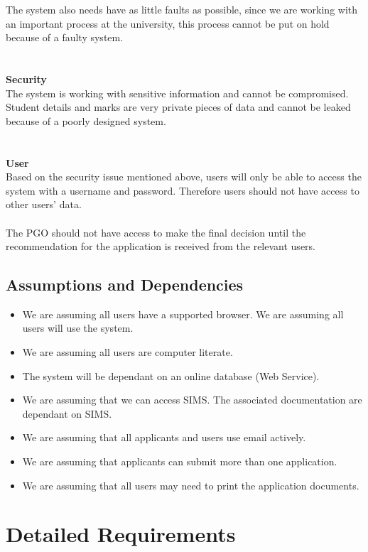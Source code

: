 \documentclass{article}
\begin{document}
The system also needs have as little faults as possible, since we are working with an important process at the university, this process cannot be put on hold because of a faulty system. \\ \\ \\
\textbf{Security} \\
The system is working with sensitive information and cannot be compromised. Student details and marks are very private pieces of data and cannot be leaked because of a poorly designed system. \\ \\ \\
\textbf{User} \\
Based on the security issue mentioned above, users will only be able to access the system with a username and password. Therefore users should not have access to other users' data. \\ \\
The PGO should not have access to make the final decision until the recommendation for the application is received from the relevant users. \\ 

\subsection{Assumptions and Dependencies}
\begin{itemize}
\item We are assuming all users have a supported browser. We are assuming all users will use the system.
\item We are assuming all users are computer literate. 
\item The system will be dependant on an online database (Web Service).
\item We are assuming that we can access SIMS. The associated documentation are dependant on SIMS.
\item We are assuming that all applicants and users use email actively.
\item We are assuming that applicants can submit more than one application.
\item We are assuming that all users may need to print the application documents.
\end{itemize}

\section{Detailed Requirements}
\end{document}
